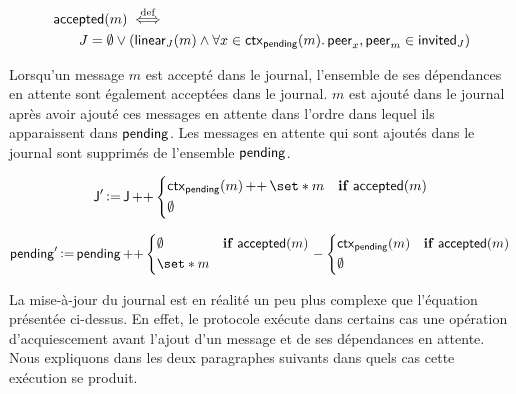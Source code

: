 \begin{equation*}\begin{split}
    \MoveEqLeft\trm{accepted}(m) \defiff\\
    &J = \emptyset \lor (\trm{linear}_J(m) \land \forall x \in \trm{ctx}_{\trm{pending}}(m) \qsep \trm{peer}_x, \trm{peer}_m \in \trm{invited}_J)
\end{split}\end{equation*}

Lorsqu'un message $m$ est accepté dans le journal, l'ensemble de ses dépendances en attente sont également acceptées dans le journal.
$m$ est ajouté dans le journal après avoir ajouté ces messages en attente dans l'ordre dans lequel ils apparaissent dans $\operatorname{\mathsf{pending}}$.
Les messages en attente qui sont ajoutés dans le journal sont supprimés de l'ensemble $\operatorname{\mathsf{pending}}$.

\begin{equation*}
    \trm{J}' \assign \trm{J} \lappend \begin{dcases}
        \trm{ctx}_{\trm{pending}}(m) \lappend \set*{m} & \when \trm{accepted}(m)\\
        \emptyset
    \end{dcases}
\end{equation*}

\begin{equation*}
    \trm{pending}' \assign \trm{pending} \lappend \begin{dcases}
        \emptyset & \when \trm{accepted}(m)\\
        \set*{m}
    \end{dcases} \sminus \begin{dcases}
        \trm{ctx}_{\trm{pending}}(m) & \when \trm{accepted}(m)\\
        \emptyset
    \end{dcases}
\end{equation*}

La mise-à-jour du journal est en réalité un peu plus complexe que l'équation présentée ci-dessus.
En effet, le protocole exécute dans certains cas une opération d'acquiescement avant l'ajout d'un message et de ses dépendances en attente.
Nous expliquons dans les deux paragraphes suivants dans quels cas cette exécution se produit.

